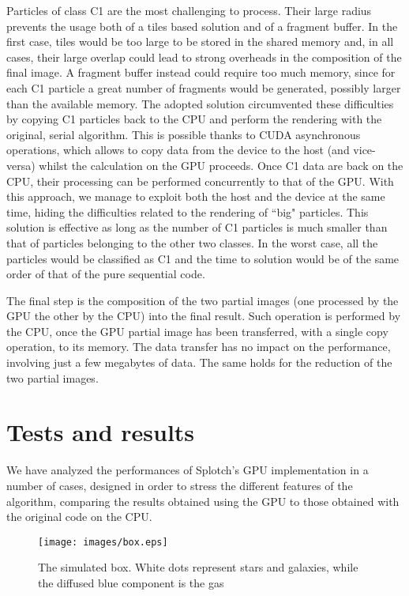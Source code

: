 \documentclass[11pt]{article}
\begin{document}
Particles of class C1 are the most challenging to process. Their large 
radius prevents the usage both of a tiles based solution and of a fragment buffer.
In the first case, tiles would be too large to be stored in the shared memory
and, in all cases, their large overlap could lead to strong overheads in the composition of the 
final image. A fragment buffer instead could require too much memory, since 
for each C1 particle a great number of fragments would be generated, possibly
larger than the available memory. The adopted solution circumvented these 
difficulties by copying C1 particles back to the CPU and perform the rendering 
with the original, serial algorithm. This is possible thanks to CUDA asynchronous
operations, which allows to copy data from the device to the host (and vice-versa)
whilst the calculation on the GPU proceeds. Once C1 data are back on the CPU, 
their processing can be performed concurrently to that of the GPU.  
With this approach, we manage to exploit both the host and the device
at the same time, hiding the difficulties related to the rendering of ``big"
particles. This solution is effective as long as the number of C1 particles 
is much smaller than that of particles belonging to the other two classes. 
In the worst case, all the particles would be classified as C1 and the time to solution 
would be of the same order of that of the pure sequential code. 

The final step is the composition of the two partial images (one processed by the
GPU the other by the CPU) into the final result. 
Such operation is performed by the CPU, 
once the GPU partial image has been transferred, with a single copy operation, to
its memory. The data transfer has no impact on the performance, involving just a few 
megabytes of data. The same holds for the reduction of the two partial images.   

\section{Tests and results}
\label{sec:results}

We have analyzed the performances of Splotch's GPU implementation in a number of cases, designed in 
order to stress the different features of the algorithm, 
comparing the results 
obtained using the GPU to those obtained with the original code on the CPU. 

\begin{figure}
\centering
\texttt{[image: images/box.eps]}
\caption{The simulated box. White dots represent stars and galaxies, while the 
diffused blue component is the gas}
\label{fig:box}
\end{figure}
\end{document}
